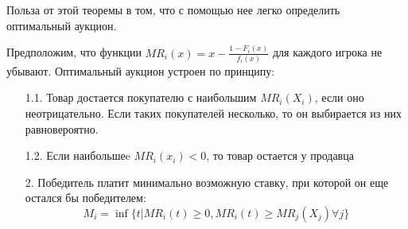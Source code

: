 Польза от этой теоремы в том, что с помощью нее легко определить оптимальный аукцион.


\begin{myth}
Предположим, что функции $ MR_{i}(x)=x-\frac{1-F_{i}(x)}{f_{i}(x)} $ для каждого игрока не убывают. Оптимальный аукцион устроен по принципу:
\begin{itemize}
\item[1.1.] Товар достается покупателю с наибольшим $ MR_{i}(X_{i}) $, если оно неотрицательно. Если таких покупателей несколько, то он выбирается из них равновероятно.
\item[1.2.] Если наибольшеe $ MR_{i}(x_{i})<0 $, то товар остается у продавца
\item[2.] Победитель платит минимально возможную ставку, при которой он еще остался бы победителем:
\begin{equation}
M_{i}=\inf\{ t| MR_{i}(t)\geq 0 , MR_{i}(t)\geq MR_{j}(X_{j}) \forall j \}
\end{equation}
\end{itemize}
\end{myth}

